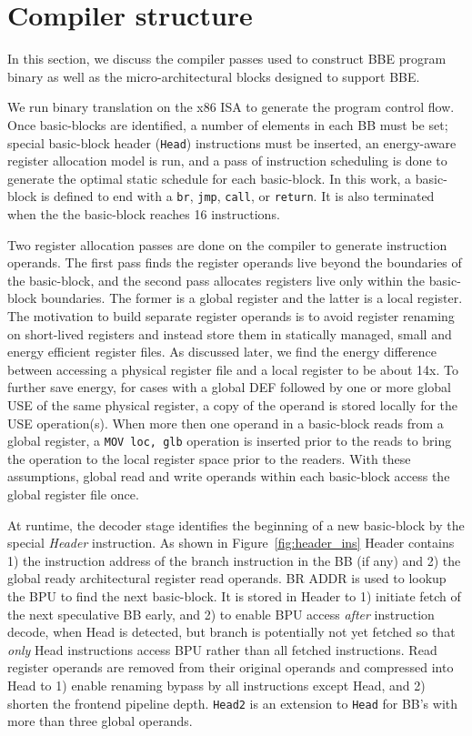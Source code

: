 \section{Compiler structure}
\label{sec:arch}

In this section, we discuss the compiler passes used to construct BBE program
binary as well as the micro-architectural blocks designed to support BBE.

We run binary translation on the x86 ISA to generate the program control flow.
Once basic-blocks are identified, a number of elements in each BB must be set;
special basic-block header (\texttt{Head}) instructions must be inserted, an
energy-aware register allocation model is run, and a pass of instruction
scheduling is done to generate the optimal static schedule for each basic-block.
In this work, a basic-block is defined to end with a \texttt{br}, \texttt{jmp},
   \texttt{call}, or \texttt{return}. It is also terminated when the
   the basic-block reaches 16 instructions. %

Two register allocation passes are done on the compiler to generate instruction
operands. The first pass finds the register operands live beyond the boundaries
of the basic-block, and the second pass allocates registers live only within the
basic-block boundaries. The former is a global register and the latter is a
local register. The motivation to build separate register operands is to avoid
register renaming on short-lived registers and instead store them in statically
managed, small and energy efficient register files. As discussed later, we find
the energy difference between accessing a physical register file and a local
register to be about 14x. To further save energy, for cases with a global DEF
followed by one or more global USE of the same physical register, a copy of the
operand is stored locally for the USE operation(s). When more then one operand
in a basic-block reads from a global register, a \texttt{MOV loc, glb}
operation is inserted prior to the reads to bring the operation to the local
register space prior to the readers. With these assumptions, global read and
write operands within each basic-block access the global register file once.

At runtime, the decoder stage identifies the beginning of a new basic-block by
the special {\it{Header}} instruction. As shown in Figure~\ref{fig:header_ins}
Header contains 1) the instruction address of the branch instruction in the BB
(if any) and 2) the global ready architectural register read operands. BR ADDR
is used to lookup the BPU to find the next basic-block. It is stored in Header
to 1) initiate fetch of the next speculative BB early, and 2) to enable BPU
access {\it{after}} instruction decode, when Head is detected, but branch is
potentially not yet fetched so that {\it{only}} Head instructions access BPU
rather than all fetched instructions. Read register operands are removed from
their original operands and compressed into Head to 1) enable renaming bypass by
all instructions except Head, and 2) shorten the frontend pipeline depth.
\texttt{Head2} is an extension to \texttt{Head} for BB's with more than three
global operands. %

